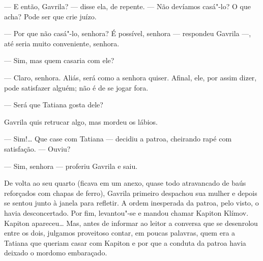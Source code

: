 --- E então, Gavrila? --- disse ela, de repente. --- Não devíamos
casá"-lo? O que acha? Pode ser que crie juízo.

--- Por que não casá"-lo, senhora? É possível, senhora --- respondeu
Gavrila ---, até seria muito conveniente, senhora.

--- Sim, mas quem casaria com ele?

--- Claro, senhora. Aliás, será como a senhora quiser. Afinal, ele, por
assim dizer, pode satisfazer alguém; não é de se jogar fora.

--- Será que Tatiana gosta dele?

Gavrila quis retrucar algo, mas mordeu os lábios.

--- Sim!\ldots{} Que case com Tatiana --- decidiu a patroa, cheirando rapé
com satisfação. --- Ouviu?

--- Sim, senhora --- proferiu Gavrila e saiu.

De volta ao seu quarto (ficava em um anexo, quase todo atravancado de
baús reforçados com chapas de ferro), Gavrila primeiro despachou sua
mulher e depois se sentou junto à janela para refletir. A ordem
inesperada da patroa, pelo visto, o havia desconcertado. Por fim,
levantou"-se e mandou chamar Kapiton Klímov. Kapiton apareceu\ldots{} Mas,
antes de informar ao leitor a conversa que se desenrolou entre os dois,
julgamos proveitoso contar, em poucas palavras, quem era a Tatiana que
queriam casar com Kapiton e por que a conduta da patroa havia deixado o
mordomo embaraçado.

